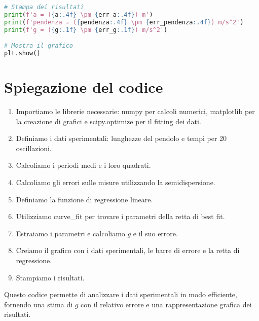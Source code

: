 \documentclass{article}
\begin{document}
\begin{lstlisting}[language=Python]
# Stampa dei risultati
print(f'a = ({a:.4f} \pm {err_a:.4f}) m')
print(f'pendenza = ({pendenza:.4f} \pm {err_pendenza:.4f}) m/s^2')
print(f'g = ({g:.1f} \pm {err_g:.1f}) m/s^2')

# Mostra il grafico
plt.show()
\end{lstlisting}

\section{Spiegazione del codice}

\begin{enumerate}
    \item Importiamo le librerie necessarie: numpy per calcoli numerici, matplotlib per la creazione di grafici e scipy.optimize per il fitting dei dati.
    
    \item Definiamo i dati sperimentali: lunghezze del pendolo e tempi per 20 oscillazioni.
    
    \item Calcoliamo i periodi medi e i loro quadrati.
    
    \item Calcoliamo gli errori sulle misure utilizzando la semidispersione.
    
    \item Definiamo la funzione di regressione lineare.
    
    \item Utilizziamo curve\_fit per trovare i parametri della retta di best fit.
    
    \item Estraiamo i parametri e calcoliamo $g$ e il suo errore.
    
    \item Creiamo il grafico con i dati sperimentali, le barre di errore e la retta di regressione.
    
    \item Stampiamo i risultati.
\end{enumerate}

Questo codice permette di analizzare i dati sperimentali in modo efficiente, fornendo una stima di $g$ con il relativo errore e una rappresentazione grafica dei risultati.
\end{document}
